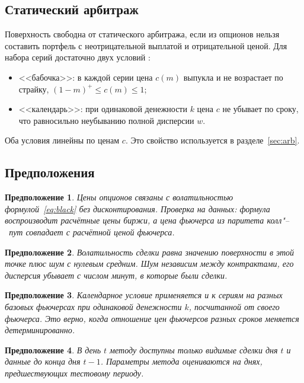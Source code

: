 \documentclass{article}
\newtheorem{assumption}{Предположение}
\begin{document}
\subsection{Статический арбитраж}

Поверхность свободна от статического арбитража, если из опционов нельзя составить портфель с неотрицательной выплатой и отрицательной ценой. Для набора серий достаточно двух условий \citep{carr2005note,gatheral2014arbitrage}:
\begin{itemize}
    \item <<бабочка>>: в каждой серии цена $c(m)$ выпукла и не возрастает по страйку, $(1-m)^+\le c(m)\le 1$;
    \item <<календарь>>: при одинаковой денежности $k$ цена $c$ не убывает по сроку, что равносильно неубыванию полной дисперсии $w$.
\end{itemize}
Оба условия линейны по ценам $c$. Это свойство используется в разделе~\ref{sec:arb}.

\subsection{Предположения}

\begin{assumption}\label{as:black}
Цены опционов связаны с волатильностью формулой~\eqref{eq:black} без дисконтирования. Проверка на данных: формула воспроизводит расчётные цены биржи, а цена фьючерса из паритета колл"--~пут совпадает с расчётной ценой фьючерса.
\end{assumption}
\begin{assumption}\label{as:noise}
Волатильность сделки равна значению поверхности в этой точке плюс шум с нулевым средним. Шум независим между контрактами, его дисперсия убывает с числом минут, в которые были сделки.
\end{assumption}
\begin{assumption}\label{as:calendar}
Календарное условие применяется и к сериям на разных базовых фьючерсах при одинаковой денежности $k$, посчитанной от своего фьючерса. Это верно, когда отношение цен фьючерсов разных сроков меняется детерминированно.
\end{assumption}
\begin{assumption}\label{as:info}
В день $t$ методу доступны только видимые сделки дня $t$ и данные до конца дня $t-1$. Параметры метода оцениваются на днях, предшествующих тестовому периоду.
\end{assumption}
\end{document}
